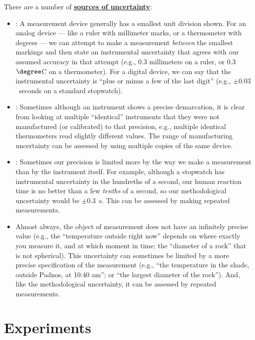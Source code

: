 \noindent There are a number of \underline{{\bf sources of uncertainty}}:
	\begin{itemize}
	\item[-] : A measurement device generally has a smallest unit division shown. For an analog device --- like a ruler with millimeter marks, or a thermometer with degrees ---  we can attempt to make a measurement {\em between} the smallest markings and then state an instrumental uncertainty that agrees with our assumed accuracy in that attempt (e.g., 0.3 millimeters on a ruler, or 0.3$\degree$C on a thermometer).  For a digital device, we can say that the instrumental uncertainty is ``plus or minus a few of the last digit'' (e.g., $\pm 0.03$~seconds on a standard stopwatch).  
	\item[-]  : Sometimes although an instrument shows a precise demarcation, it is clear from looking at multiple ``identical'' instruments that they were not manufactured (or calibrated) to that precision, e.g., multiple identical thermometers read slightly different values.  The range of manufacturing uncertainty can be assessed by using multiple copies of the same device.
	\item[-] : Sometimes our precision is limited more by the way we make a measurement than by the instrument itself.  For example, although a stopwatch has instrumental uncertainty in the hundreths of a second, our human reaction time is no better than a few {\em tenths} of a second, so our methodological uncertainty would be $\pm0.3$~s.  This can be assessed by making repeated measurements.
	\item[-]  Almost always, the object of measurement does not have an infinitely precise value (e.g., the ``temperature outside right now'' depends on where exactly you measure it, and at which moment in time; the ``diameter of a rock'' that is not spherical).  This uncertainty can sometimes be limited by a more precise specification of the measurement (e.g., ``the temperature in the shade, outside Padnos, at 10:40 am''; or ``the largest diameter of the rock'').  And, like the methodological uncertainty, it can be assessed by repeated measurements.
	\end{itemize}
	
	
\section{Experiments}

